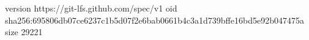 version https://git-lfs.github.com/spec/v1
oid sha256:695806db07ce6237c1b5d07f2e6bab0661b4c3a1d739bffe16bd5e92b047475a
size 29221
